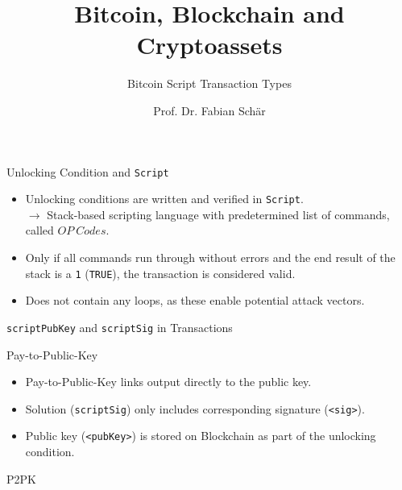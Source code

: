 \documentclass[handout]{beamer}
\title{Bitcoin, Blockchain and Cryptoassets}
\subtitle{Bitcoin Script Transaction Types}
\author{Prof. Dr. Fabian Schär}
\institute{University of Basel}
\begin{document}
\thispagestyle{empty}
\begin{frame}[noframenumbering]
	\titlepage
\end{frame}


\begin{frame}{Unlocking Condition and \texttt{Script}}
\begin{itemize}
	\item Unlocking conditions are written and verified in \texttt{Script}.\\
	 $\rightarrow$ Stack-based scripting language with predetermined list of commands, called $OP\ Codes$.
	 \item Only if all commands run through without errors and the end result of the stack is a \texttt{1} (\texttt{TRUE}), the transaction is considered valid.
	 \item Does not contain any loops, as these enable potential attack vectors.
\end{itemize}
\end{frame}


\begin{frame}{\texttt{scriptPubKey} and \texttt{scriptSig} in Transactions}
\begin{figure}
	
\end{figure}
\end{frame}


\begin{frame}{Pay-to-Public-Key}
\vspace{1em}
\begin{itemize}
	\item{Pay-to-Public-Key links output directly to the public key.}
	\item{Solution (\texttt{scriptSig}) only includes corresponding signature (\texttt{<sig>}).}
	\item{Public key (\texttt{<pubKey>}) is stored on Blockchain as part of the unlocking condition.}
\end{itemize}
\end{frame}


\begin{frame}{P2PK}
\begin{figure}
\centering

\end{figure}
\end{frame}
\end{document}
